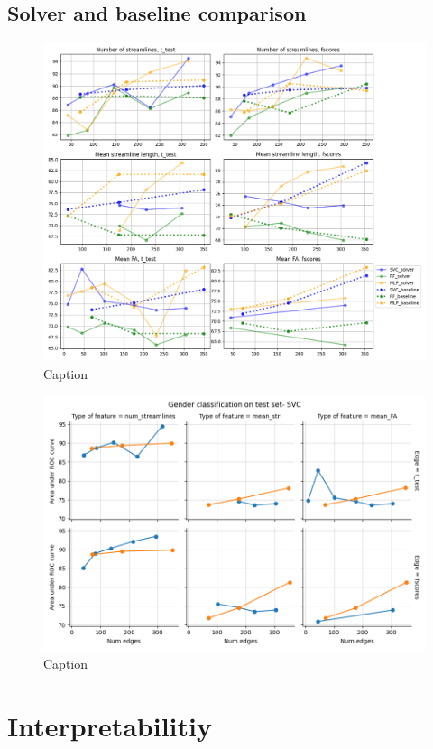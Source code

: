 \documentclass[msthesis.tex]{subfiles}
\begin{document}
\subsection{Solver and baseline comparison}
\begin{figure}
    \centering
    \includegraphics[width=\textwidth]{images/classification_gender_clf_combined.png}
    \caption{Caption}
    \label{fig:my_label}
\end{figure}
\begin{figure}
    \centering
    \includegraphics[width = \textwidth]{images/Gender_classification_comparison_SVC.png}
    \caption{Caption}
    \label{fig:my_label}
\end{figure}
\section{Interpretabilitiy}
\end{document}
